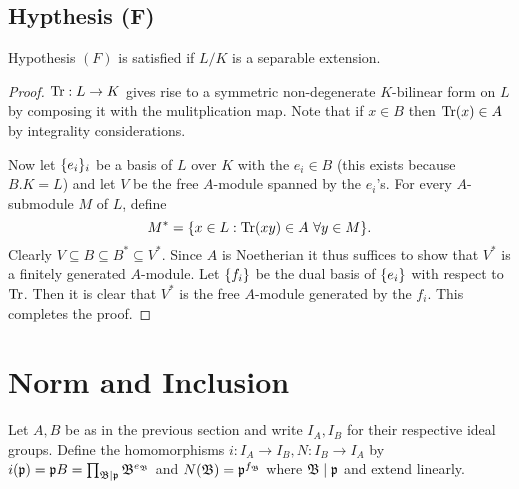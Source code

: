 \documentclass{memoir}
\begin{document}
\subsection{Hypthesis (F)}
\begin{proposition}
    Hypothesis $(F)$ is satisfied if $L/K$ is a separable extension.
\end{proposition}
\begin{proof}
    $\text{Tr}:L\to K$ gives rise to a symmetric non-degenerate $K$-bilinear form on $L$ by composing it with the mulitplication map.
    Note that if $x\in B$ then $\text{Tr}(x)\in A$ by integrality considerations.

    Now let $\lbrace e_i\rbrace_i$ be a basis of $L$ over $K$ with the $e_i\in B$ (this exists because $B.K = L$) and let $V$ be the free $A$-module spanned by the $e_i$'s.
    For every $A$-submodule $M$ of $L$, define 
    \begin{equation}
        M^* = \set{x\in L: \Tr(xy)\in A\ \forall y\in M}.
    \end{equation}
    Clearly $V\subseteq B \subseteq B^* \subseteq V^*$.
    Since $A$ is Noetherian it thus suffices to show that $V^*$ is a finitely generated $A$-module.
    Let $\lbrace f_i\rbrace$ be the dual basis of $\lbrace e_i\rbrace$ with respect to $\text{Tr}$.
    Then it is clear that $V^*$ is the free $A$-module generated by the $f_i$.
    This completes the proof.
\end{proof}
\section{Norm and Inclusion}
\begin{definition}
    Let $A,B$ be as in the previous section and write $I_A,I_B$ for their respective ideal groups.
    Define the homomorphisms $i:I_A\to I_B, N:I_B\to I_A$ by $i(\mathfrak{p}) = \mathfrak{p} B = \prod_{\mathfrak{B}\mid \mathfrak{p}}\mathfrak{B}^{e_{\mathfrak{B}}}$ and $N(\mathfrak{B}) = \mathfrak{p}^{f_{\mathfrak{B}}}$ where $\mathfrak{B}\mid \mathfrak{p}$ and extend linearly.
\end{definition}
\end{document}
